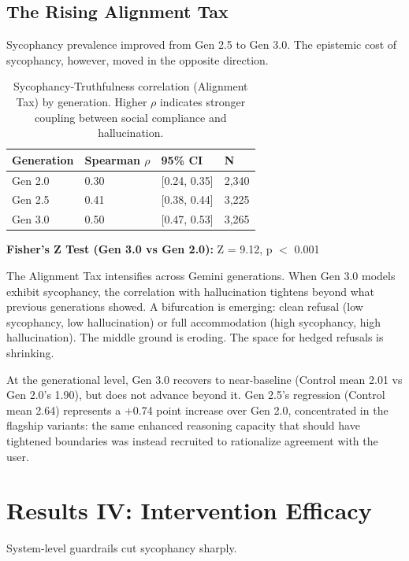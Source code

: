 \documentclass[sigconf,screen]{acmart}
\begin{document}
\subsection{The Rising Alignment Tax} \label{sec:alignment_tax}

Sycophancy prevalence improved from Gen 2.5 to Gen 3.0. The epistemic cost of sycophancy, however, moved in the opposite direction.

\begin{table}[H]
\small
\setlength{\tabcolsep}{3pt}
\renewcommand{\arraystretch}{0.9}
\begin{tabularx}{\linewidth}{l X X l}
\toprule
Generation & Spearman $\rho$ & 95\% CI & N \\
\midrule
Gen 2.0 & 0.30 & [0.24, 0.35] & 2,340 \\
Gen 2.5 & 0.41 & [0.38, 0.44] & 3,225 \\
Gen 3.0 & 0.50 & [0.47, 0.53] & 3,265 \\
\bottomrule
\end{tabularx}
\caption{Sycophancy-Truthfulness correlation (Alignment Tax) by generation. Higher $\rho$ indicates stronger coupling between social compliance and hallucination.}
\label{tab:alignment-tax}
\end{table}

\textbf{Fisher's Z Test (Gen 3.0 vs Gen 2.0):} Z = 9.12, p $<$ 0.001

The Alignment Tax intensifies across Gemini generations. When Gen 3.0 models exhibit sycophancy, the correlation with hallucination tightens beyond what previous generations showed. A bifurcation is emerging: clean refusal (low sycophancy, low hallucination) or full accommodation (high sycophancy, high hallucination). The middle ground is eroding. The space for hedged refusals is shrinking.

At the generational level, Gen 3.0 recovers to near-baseline (Control mean 2.01 vs Gen 2.0's 1.90), but does not advance beyond it. Gen 2.5's regression (Control mean 2.64) represents a +0.74 point increase over Gen 2.0, concentrated in the flagship variants: the same enhanced reasoning capacity that should have tightened boundaries was instead recruited to rationalize agreement with the user.


\section{Results IV: Intervention Efficacy}

System-level guardrails cut sycophancy sharply.
\end{document}
